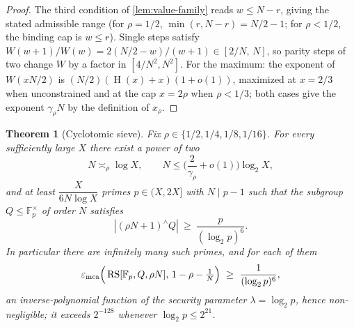 \documentclass[11pt]{article}
\newtheorem{theorem}{Theorem}[section]
\theoremstyle{definition}
\newcommand{\F}{\mathbb F}
\newcommand{\RS}{\operatorname{RS}}
\newcommand{\eps}{\varepsilon}
\newcommand{\HH}{\operatorname{H}}
\begin{document}
\begin{proof}
The third condition of \cref{lem:value-family} reads $w\le N-r$, giving the stated admissible range (for $\rho=1/2$, $\min(r,N-r)=N/2-1$; for $\rho<1/2$, the binding cap is $w\le r$).  Single steps satisfy $W(w+1)/W(w)=2(N/2-w)/(w+1)\in[2/N,\,N]$, so parity steps of two change $W$ by a factor in $[4/N^2,N^2]$.  For the maximum: the exponent of $W(xN/2)$ is $(N/2)(\HH(x)+x)(1+o(1))$, maximized at $x=2/3$ when unconstrained and at the cap $x=2\rho$ when $\rho<1/3$; both cases give the exponent $\gamma_\rho N$ by the definition of $x_\rho$.
\end{proof}

\begin{theorem}[Cyclotomic sieve]\label{thm:sieve}
Fix $\rho\in\{1/2,1/4,1/8,1/16\}$.  For every sufficiently large $X$ there exist a power of two
\[
        N\asymp_\rho \log X,
        \qquad
        N\le\Big(\frac{2}{\gamma_\rho}+o(1)\Big)\log_2X,
\]
and at least $\dfrac{X}{6N\log X}$ primes $p\in(X,2X]$ with $N\mid p-1$ such that the subgroup $Q\le\F_p^\times$ of order $N$ satisfies
\[
        |(\rho N+1)^{\wedge}Q|\ \ge\ \frac{p}{(\log_2 p)^{6}} .
\]
In particular there are infinitely many such primes, and for each of them
\[
        \eps_{\rm mca}\Big(\RS[\F_p,Q,\rho N],\,1-\rho-\tfrac1N\Big)
        \ \ge\ \frac{1}{(\log_2p)^6},
\]
an inverse-polynomial function of the security parameter $\lambda=\log_2p$, hence non-negligible; it exceeds $2^{-128}$ whenever $\log_2p\le2^{21}$.
\end{theorem}
\end{document}
